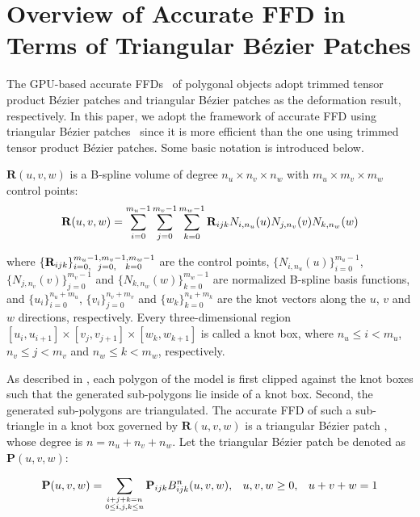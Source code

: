 \documentclass[3p]{elsarticle}
\begin{document}
\section{Overview of Accurate FFD in Terms of Triangular B\'ezier Patches}

The GPU-based accurate FFDs~\cite{Cui13, Cui14} of polygonal objects adopt trimmed tensor product B\'ezier patches and
triangular B\'ezier patches as the deformation result, respectively. In this paper, we adopt the framework of accurate
FFD using triangular B\'ezier patches~\cite{Feng98, Feng00, Cui14} since it is more efficient than the one using trimmed
tensor product B\'ezier patches. Some basic notation is introduced below.

$\mathbf R(u,v,w)$ is a B-spline volume of degree $n_u\times n_v\times n_w$ with $m_u\times m_v\times m_w$ control
points:
\begin{equation}
	\footnotesize
	{\mathbf R}(u,v,w) 
	= \sum_{i=0}^{m_u-1}\sum_{j=0}^{m_v-1}\sum_{k=0}^{m_w-1} {\mathbf
	R}_{ijk}N_{i,n_u}(u)N_{j,n_v}(v)N_{k,n_w}(w)
	\label{equ:Ruvw}
\end{equation}

\noindent where $\{\mathbf R_{ijk}\}_{i=0,\hspace{6 pt} j=0,\hspace{8 pt} k=0}^{m_u-1,m_v-1,m_w-1}$ are the control
points, $\{N_{i,n_u}(u)\}_{i=0}^{m_u-1}$, $\{N_{j,n_v}(v)\}_{j=0}^{m_v-1}$ and $\{N_{k,n_w}(w)\}_{k=0}^{m_w-1}$ are
normalized B-spline basis functions, and $\{u_i\}^{n_u+m_u}_{i=0}$, $\{v_i\}^{n_v+m_v}_{j=0}$ and
$\{w_k\}^{n_k+m_k}_{k=0}$ are the knot vectors along the $u$, $v$ and $w$ directions, respectively. Every
three-dimensional region $[u_i, u_{i+1}] \times [v_j, v_{j+1}] \times [w_k, w_{k+1}]$ is called a knot box, where
$n_u\leq i < m_u$, $n_v\leq j < m_v$ and $n_w\leq k < m_w$, respectively.

As described in \cite{Feng98, Feng00, Cui14}, each polygon of the model is first clipped against the knot boxes such
that the generated sub-polygons lie inside of a knot box. Second, the generated sub-polygons are triangulated. The
accurate FFD of such a sub-triangle in a knot box governed by $\mathbf R(u,v,w)$ is a triangular B\'ezier patch
\cite{Feng98, Feng00}, whose degree is $n=n_u+n_v+n_w$. Let the triangular B\'ezier patch be denoted as ${\mathbf
P}(u,v,w)$:

\begin{equation}
	\footnotesize
	{\mathbf P}(u,v,w)
	= \sum_{\substack{i+j+k=n \\ 0\leq i,j,k\leq n}} {\mathbf P}_{ijk}B^n_{ijk}(u,v,w), \hspace{8 pt} u,v,w\ge0,
		\hspace{8 pt}u+v+w=1
	\label{equ:Puvw}
\end{equation}
\end{document}
